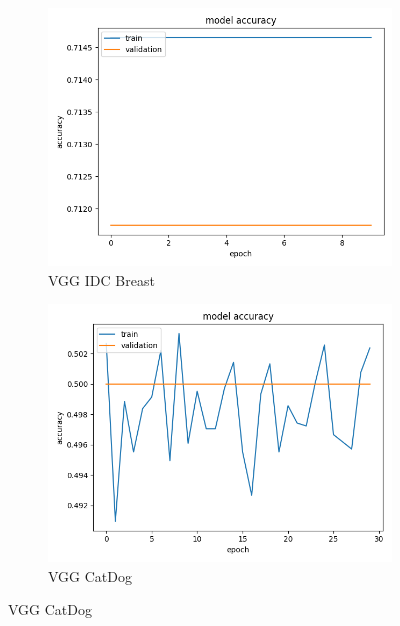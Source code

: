 \begin{figure}
\begin{subfigure}[b]{.45\linewidth}
\includegraphics[width=\linewidth]{Figs/vgg_breast_acc.jpg}
\caption{VGG IDC Breast}
\end{subfigure}
\begin{subfigure}[b]{.45\linewidth}
\includegraphics[width=\linewidth]{Figs/vgg_catdog_acc.jpg}
\caption{VGG CatDog}
\end{subfigure}


\end{figure}
